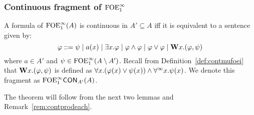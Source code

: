 \subsubsection{Continuous fragment of $\mathrm{FOE}^{\infty}_1$}

\begin{theorem}\label{thm:ofoeicont}
A formula of $\mathrm{FOE}^{\infty}_1(A)$ is continuous in $ A' \subseteq A$ iff it is equivalent to a sentence given by:
\[
\varphi ::= \psi \mid a(x) \mid \exists x.\varphi \mid \varphi \land \varphi \mid \varphi \lor \varphi \mid \mathbf{W} x.(\varphi,\psi)
\]
where $a\in A'$ and $\psi \in \mathrm{FOE}^{\infty}_1(A\setminus A')$. Recall from Definition~\ref{def:contmufoei} that $\mathbf{W} x.(\varphi,\psi)$ is defined as $\forall x.(\varphi(x) \lor \psi(x)) \land \forall^\infty x.\psi(x)$. We denote this fragment as $\mathrm{FOE}^{\infty}_1\mathsf{CON}_{A'}(A)$.
\end{theorem}

\noindent The theorem will follow from the next two lemmas and Remark~\ref{rem:contprodeach}.

